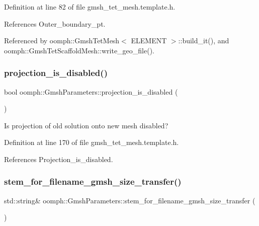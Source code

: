 Definition at line 82 of file gmsh\+\_\+tet\+\_\+mesh.\+template.\+h.



References Outer\+\_\+boundary\+\_\+pt.



Referenced by oomph\+::\+Gmsh\+Tet\+Mesh$<$ E\+L\+E\+M\+E\+N\+T $>$\+::build\+\_\+it(), and oomph\+::\+Gmsh\+Tet\+Scaffold\+Mesh\+::write\+\_\+geo\+\_\+file().

\mbox{\label{classoomph_1_1GmshParameters_ac8b37d79ebc135382c2320c3ba405a3f}} 
\subsubsection{\texorpdfstring{projection\+\_\+is\+\_\+disabled()}{projection\_is\_disabled()}}
{\footnotesize\ttfamily bool oomph\+::\+Gmsh\+Parameters\+::projection\+\_\+is\+\_\+disabled (\begin{DoxyParamCaption}{ }\end{DoxyParamCaption})\hspace{0.3cm}{\ttfamily [inline]}}



Is projection of old solution onto new mesh disabled? 



Definition at line 170 of file gmsh\+\_\+tet\+\_\+mesh.\+template.\+h.



References Projection\+\_\+is\+\_\+disabled.

\mbox{\label{classoomph_1_1GmshParameters_a6006bbce01fab0e48e474f077fc926e7}} 
\subsubsection{\texorpdfstring{stem\+\_\+for\+\_\+filename\+\_\+gmsh\+\_\+size\+\_\+transfer()}{stem\_for\_filename\_gmsh\_size\_transfer()}}
{\footnotesize\ttfamily std\+::string\& oomph\+::\+Gmsh\+Parameters\+::stem\+\_\+for\+\_\+filename\+\_\+gmsh\+\_\+size\+\_\+transfer (\begin{DoxyParamCaption}{ }\end{DoxyParamCaption})\hspace{0.3cm}{\ttfamily [inline]}}



